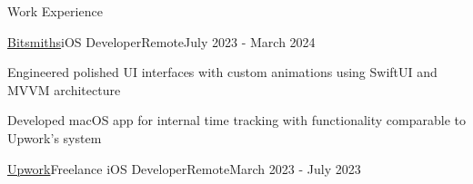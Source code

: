 \begin{resume_section}{Work Experience}
\begin{resume_employer}{\href{http://bitsmiths.io}{Bitsmiths}}{iOS Developer}{Remote}{July 2023 - March 2024}




\item Engineered polished UI interfaces with custom animations using SwiftUI and MVVM architecture
\item Developed macOS app for internal time tracking with functionality comparable to Upwork's system
\end{resume_employer}




  \begin{resume_employer}{\href{https://www.upwork.com/freelancers/~018ad8f0c1b6c76e9c}{Upwork}}{Freelance iOS Developer}{Remote}{March 2023 - July 2023}
  

\end{resume_employer}
\end{resume_section}
